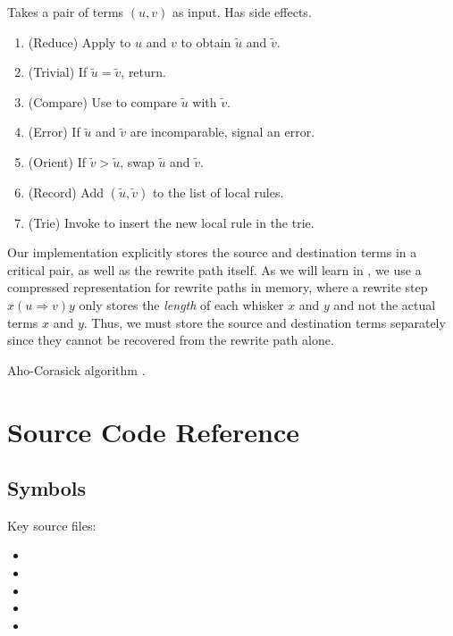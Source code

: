 \documentclass[../generics]{subfiles}
\begin{document}
\begin{algorithm}\label{add rewrite rule}
Takes a pair of terms $(u,v)$ as input. Has side effects.
\begin{enumerate}
\item (Reduce) Apply  to $u$ and $v$ to obtain $\tilde{u}$ and $\tilde{v}$.
\item (Trivial) If $\tilde{u}=\tilde{v}$, return.
\item (Compare) Use  to compare $\tilde{u}$ with $\tilde{v}$.
\item (Error) If $\tilde{u}$ and $\tilde{v}$ are incomparable, signal an error.
\item (Orient) If $\tilde{v}>\tilde{u}$, swap $\tilde{u}$ and $\tilde{v}$.
\item (Record) Add $(\tilde{u},\tilde{v})$ to the list of local rules.
\item (Trie) Invoke  to insert the new local rule in the trie.
\end{enumerate}
\end{algorithm}

Our implementation explicitly stores the source and destination terms in a critical pair, as well as the rewrite path itself. As we will learn in , we use a compressed representation for rewrite paths in memory, where a rewrite step $x(u\Rightarrow v)y$ only stores the \emph{length} of each whisker $x$ and $y$ and not the actual terms $x$ and $y$. Thus, we must store the source and destination terms separately since they cannot be recovered from the rewrite path alone.

Aho-Corasick algorithm \cite{ahocorasick}.

\section{Source Code Reference}\label{symbols terms rules sourceref}

\subsection*{Symbols}

Key source files:
\begin{itemize}
\item {}
\item {}
\item {}
\item {}
\item {}
\end{itemize}
\end{document}

